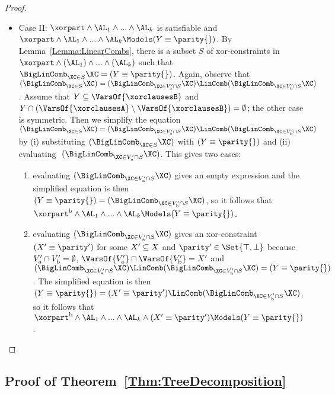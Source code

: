 \begin{proof}
\begin{itemize}
 \item Case II:
  $\xorpart \land \AL_1 \land ... \land \AL_k$ is satisfiable
  and
  $\xorpart \land \AL_1 \land ... \land \AL_k \Models (Y \equiv \parity{})$.
By Lemma~\ref{Lemma:LinearCombs},
 there is a subset $S$ of xor-constraints
  in $\xorpart \land (\AL_1) \land ... \land (\AL_k)$
  such that ${\BigLinComb_{\XC \in S} \XC} = (Y \equiv \parity{})$.
Again,
  observe that
  $(\BigLinComb_{\XC \in S} \XC) = 
   (\BigLinComb_{\XC \in {\CutAp \cap S}} \XC) \LinComb
   (\BigLinComb_{\XC \in {\CutBp \cap S}} \XC)$.
Assume that $Y \subseteq \VarsOf{\xorclausesB}$ and $ Y \cap (\VarsOf{\xorclausesA} \setminus \VarsOf{\xorclausesB}) = \emptyset $; the other case is symmetric.
Then we simplify the equation
$(\BigLinComb_{\XC \in S} \XC) = 
(\BigLinComb_{\XC \in {\CutAp \cap S}} \XC) \LinComb
(\BigLinComb_{\XC \in {\CutBp \cap S}} \XC)$ 
by (i) substituting $(\BigLinComb_{\XC \in S} \XC)$ with $ (Y \equiv \parity{})$ and (ii) evaluating $ (\BigLinComb_{\XC \in {\CutAp \cap S}} \XC) $.
This gives two cases:
\begin{enumerate}
\item evaluating $ (\BigLinComb_{\XC \in {\CutAp \cap S}} \XC) $ gives
an empty expression and the simplified equation is then $ (Y \equiv \parity{}) = (\BigLinComb_{\XC \in {\CutBp \cap S}} \XC)$, so it follows that
  $\xorpartB \land \AL_1 \land ... \land \AL_k \Models (Y \equiv \parity{})$.

\item evaluating $ (\BigLinComb_{\XC \in {\CutAp \cap S}} \XC) $ gives
an xor-constraint $ (\Iface \equiv \Ifaceparity{}) $ for some $ X' \subseteq X $ and $\Ifaceparity{} \in \Set{\top, \bot}$ because 
  $V'_\textup{a} \cap V'_\textup{b} = \emptyset$,
  ${\VarsOf{\CutAp} \cap \VarsOf{\CutBp}} = \Iface$ and
  $(\BigLinComb_{\XC \in {\CutAp \cap S}} \XC) \LinComb
   (\BigLinComb_{\XC \in {\CutBp \cap S}} \XC) = (Y \equiv \parity{})$.
The simplified equation is then $ (Y \equiv \parity{}) = (\Iface \equiv \Ifaceparity{}) \LinComb (\BigLinComb_{\XC \in {\CutBp \cap S}} \XC)$,
so it follows that
  $\xorpartB \land {\AL_1 \land ... \land \AL_k \land (\Iface \equiv \Ifaceparity)} \Models (Y \equiv \parity{})$.
\end{enumerate}
\end{itemize}
\end{proof}

\subsection{Proof of Theorem~\ref{Thm:TreeDecomposition}}

